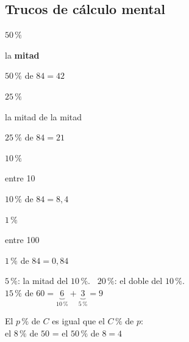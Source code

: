 \documentclass[11pt,a4paper]{article}
\newcommand{\heavy}{\fontseries{eb}\selectfont}
\newcommand{\pc}{\,\%}
\begin{document}
\vfill
\subsection{Trucos de cálculo mental}
\begin{tcbraster}[raster columns=4,raster equal height,raster column skip=8pt]
\begin{tcolorbox}[fmbase,colback=fmdefbg,colframe=fmdef,before upper=\centering,top=2mm,bottom=2mm]
{\Large\heavy\color{fmblue}$50\pc$}\par la \textbf{mitad}\par{\small$50\pc$ de $84=42$}
\end{tcolorbox}
\begin{tcolorbox}[fmbase,colback=fmdefbg,colframe=fmdef,before upper=\centering,top=2mm,bottom=2mm]
{\Large\heavy\color{fmblue}$25\pc$}\par la mitad de la mitad\par{\small$25\pc$ de $84=21$}
\end{tcolorbox}
\begin{tcolorbox}[fmbase,colback=fmdefbg,colframe=fmdef,before upper=\centering,top=2mm,bottom=2mm]
{\Large\heavy\color{fmblue}$10\pc$}\par entre 10\par{\small$10\pc$ de $84=8{,}4$}
\end{tcolorbox}
\begin{tcolorbox}[fmbase,colback=fmdefbg,colframe=fmdef,before upper=\centering,top=2mm,bottom=2mm]
{\Large\heavy\color{fmblue}$1\pc$}\par entre 100\par{\small$1\pc$ de $84=0{,}84$}
\end{tcolorbox}
\end{tcbraster}

\vfill
\begin{minipage}[t]{0.5\linewidth}
\begin{truc}[Combínalos]
$5\pc$: la mitad del $10\pc$. \ $20\pc$: el doble del $10\pc$.\\[4pt]
$15\pc$ de $60=\underbrace{6}_{10\pc}+\underbrace{3}_{5\pc}=9$
\end{truc}
\end{minipage}\hfill
\begin{minipage}[t]{0.47\linewidth}
\begin{truc}
El $p\pc$ de $C$ es igual que el $C\pc$ de $p$:\\[4pt]
el $8\pc$ de $50$ = el $50\pc$ de $8=\boxed{4}$
\end{truc}
\end{minipage}
\end{document}
